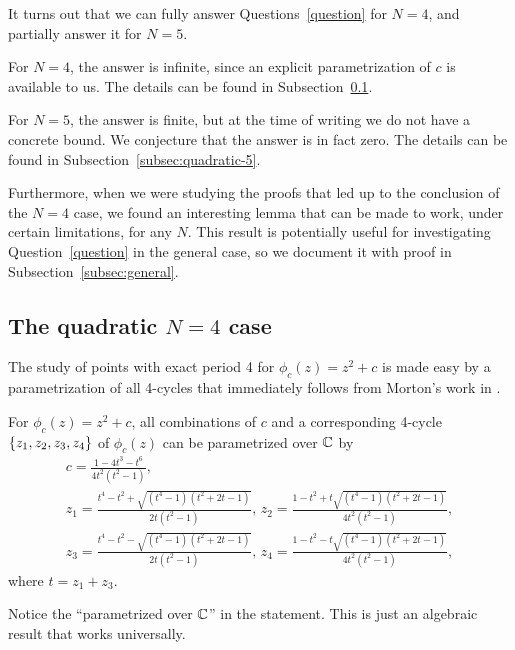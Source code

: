 It turns out that we can fully answer Questions~\ref{question} for
$N = 4$, and partially answer it for $N = 5$.

For $N = 4$, the answer is infinite, since an explicit parametrization
of $c$ is available to us. The details can be found in
Subsection~\ref{subsec:quadratic-4}.

For $N = 5$, the answer is finite, but at the time of writing we
do not have a concrete bound. We conjecture that the answer is in fact
zero. The details can be found in Subsection~\ref{subsec:quadratic-5}.

Furthermore, when we were studying the proofs that led up to the
conclusion of the $N = 4$ case, we found an interesting lemma that can
be made to work, under certain limitations, for any $N$. This result
is potentially useful for investigating Question~\ref{question} in the
general case, so we document it with proof in
Subsection~\ref{subsec:general}.

\subsection{The quadratic $N = 4$ case}
\label{subsec:quadratic-4}

The study of points with exact period 4 for $\phi_c(z) = z^2 + c$ is
made easy by a parametrization of all 4-cycles that immediately
follows from Morton's work in \cite{MR1665198}.

\begin{proposition}
  For $\phi_c(z) = z^2 + c$, all combinations of $c$ and a
  corresponding 4-cycle $\left\{z_1, z_2, z_3, z_4\right\}$ of $\phi_c(z)$ can
  be parametrized over $\mathbb{C}$ by
  \begin{equation}
    \label{eq:4-param}
    \begin{gathered}
      c = \frac{1 - 4t^3 - t^6}{4t^2(t^2 - 1)}, \\
      z_1 = \frac{t^4 - t^2 + \sqrt{(t^4 - 1)(t^2 + 2t - 1)}}{2t(t^2 -
        1)},\,
      z_2 = \frac{1 - t^2 + t \sqrt{(t^4 - 1)(t^2 + 2t - 1)}}{4t^2(t^2
        - 1)}, \\
      z_3 = \frac{t^4 - t^2 - \sqrt{(t^4 - 1)(t^2 + 2t - 1)}}{2t(t^2 -
        1)},\,
      z_4 = \frac{1 - t^2 - t \sqrt{(t^4 - 1)(t^2 + 2t - 1)}}{4t^2(t^2
        - 1)},
    \end{gathered}
  \end{equation}
  where $t = z_1 + z_3$.
\end{proposition}

\begin{remark}
  Notice the ``parametrized over $\mathbb{C}$'' in the statement. This is just
  an algebraic result that works universally.
\end{remark}

